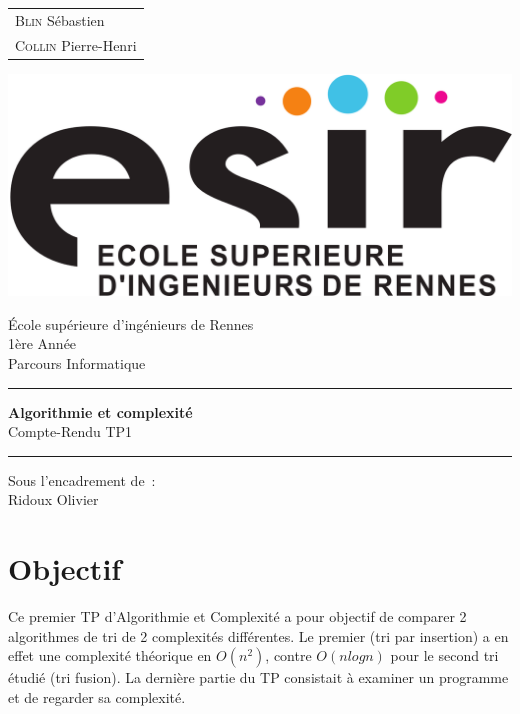 \documentclass{article}
\begin{document}
\begin{titlepage}
	\vspace{-20px}
	\begin{tabular}{l}
		\textsc{Blin} S\'ebastien\\
		\textsc{Collin} Pierre-Henri
	\end{tabular}
	\hfill \vspace{10px}\includegraphics[scale=0.1]{esir.png}\\
	\vfill
	\begin{center}
		\Huge{\'Ecole sup\'erieure d'ing\'enieurs de Rennes}\\
		\vspace{1cm}
		\LARGE{1\`ere Ann\'ee}\\
		\large{Parcours Informatique}\\
		\vspace{0.5cm}\hrule\vspace{0.5cm}
		\LARGE{\textbf{Algorithmie et complexité}}\\
		\Large{Compte-Rendu TP1}
		\vspace{0.5cm}\hrule
		\vfill
		\vfill
	\end{center}
	\begin{flushleft}
		\Large{Sous l'encadrement de~:}\\
		\vspace{0.2cm}
		\large{{Ridoux} Olivier}
	\end{flushleft}
	\vfill
\end{titlepage}

\section{Objectif}
Ce premier TP d'Algorithmie et Complexité a pour objectif de comparer 2 algorithmes de tri de 2 complexités différentes. Le premier (tri par insertion) a en effet une complexité théorique en $O(n^2)$, contre $O(nlogn)$ pour le second tri étudié (tri fusion). La dernière partie du TP consistait à examiner un programme et de regarder sa complexité.
\end{document}
